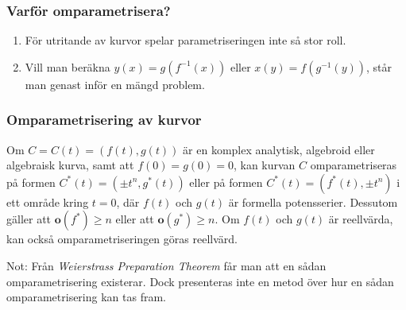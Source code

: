 \documentclass{beamer}
\begin{document}
\begin{frame}
	\frametitle{Varför omparametrisera?}
	\begin{enumerate}
		\item För utritande av kurvor spelar parametriseringen inte så stor roll.
		
		\item Vill man beräkna $y(x) = g(f^{-1}(x))$ eller $x(y) = f(g^{-1}(y))$, står man genast inför en mängd problem.
	\end{enumerate}
\end{frame}

\begin{frame}
	\frametitle{Omparametrisering av kurvor}
\begin{Theorem}
	\label{ReparametrizeTheorem}
	Om $C = C(t) = \left(f(t), g(t)\right)$ är en komplex analytisk, algebroid eller algebraisk kurva, samt att $f(0) = g(0) = 0$, kan kurvan $C$ omparametriseras på formen $C^*(t) = \left(\pm t^n, g^*(t)\right)$ eller på formen $C^*(t) = \left(f^*(t), \pm t^n \right)$ i ett område kring $t = 0$, där $f(t)$ och $g(t)$ är formella potensserier. Dessutom gäller att $\mathbf{o}\left(f^*\right) \geq n$ eller att $\mathbf{o}\left(g^*\right) \geq n$. Om $f(t)$ och $g(t)$ är reellvärda, kan också omparametriseringen göras reellvärd.
\end{Theorem}

\vspace{20pt}
\scriptsize Not: Från \emph{Weierstrass Preparation Theorem} får man att en sådan omparametrisering existerar. Dock presenteras inte en metod över hur en sådan omparametrisering kan tas fram.
\end{frame}
\end{document}
